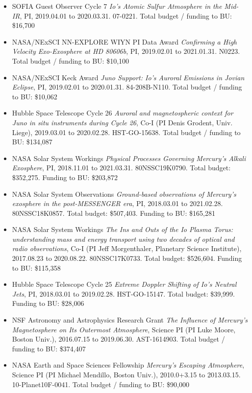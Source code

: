 \documentclass[12pt]{report}
\begin{document}
\begin{itemize}
 \item SOFIA Guest Observer Cycle 7 {\it Io's Atomic Sulfur Atmosphere in the Mid-IR}, PI, 2019.04.01 to 2020.03.31. 07-0221. Total budget / funding to BU: \$16,700
 \item NASA/NExSCI NN-EXPLORE WIYN PI Data Award {\it Confirming a High Velocity Exo-Exosphere at HD 80606b}, PI, 2019.02.01 to 2021.01.31. N0223. Total budget / funding to BU: \$10,100
 \item NASA/NExSCI Keck Award {\it Juno Support: Io's Auroral Emissions in Jovian Eclipse}, PI, 2019.02.01 to 2020.01.31. 84-208B-N110. Total budget / funding to BU: \$10,062
 \item Hubble Space Telescope Cycle 26 {\it Auroral and magnetospheric context for Juno in situ instruments during Cycle 26}, Co-I (PI Denis Grodent, Univ. Liege), 2019.03.01 to 2020.02.28. HST-GO-15638. Total budget / funding to BU: \$134,087
 \item NASA Solar System Workings  {\it Physical Processes Governing Mercury's Alkali Exosphere}, PI, 2018.11.01 to 2021.03.31. 80NSSC19K0790. Total budget: \$352,275. Funding to BU: \$203,872
 \item NASA Solar System Observations {\it Ground-based observations of Mercury's exosphere in the post-MESSENGER era}, PI, 2018.03.01 to 2021.02.28. 80NSSC18K0857. Total budget: \$507,403. Funding to BU: \$165,281
 \item NASA Solar System Workings {\it The Ins and Outs of the Io Plasma Torus: understanding mass and energy transport using two decades of optical and radio observations}, Co-I (PI Jeff Morgenthaler, Planetary Science Institute), 2017.08.23 to 2020.08.22. 80NSSC17K0733. Total budget: \$526,604. Funding to BU: \$115,358
 \item Hubble Space Telescope Cycle 25 {\it Extreme Doppler Shifting of Io's Neutral Jets}, PI, 2018.03.01 to 2019.02.28. HST-GO-15147. Total budget: \$39,999. Funding to BU: \$28,006
 \item NSF Astronomy and Astrophysics Research Grant {\it The Influence of Mercury's Magnetosphere on Its Outermost Atmosphere}, Science PI (PI Luke Moore, Boston Univ.), 2016.07.15 to 2019.06.30. AST-1614903. Total budget / funding to BU: \$374,407
 \item NASA Earth and Space Sciences Fellowship {\it Mercury's Escaping Atmosphere}, Science PI (PI Michael Mendillo, Boston Univ.), 2010.0+3.15 to 2013.03.15. 10-Planet10F-0041. Total budget / funding to BU: \$90,000
 \end{itemize}
\vspace{2 mm}
\end{document}
